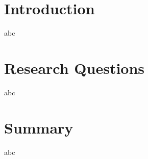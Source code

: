\documentclass{beamer}
\begin{document}
\section{Introduction}
\begin{frame}
    abc
\end{frame} 

\section{Research Questions}
\begin{frame}
    abc
\end{frame} 

\section{Summary}
\begin{frame}
    abc
\end{frame} 
\end{document}
